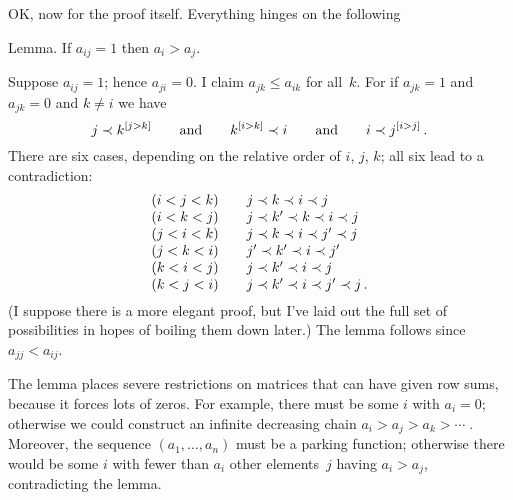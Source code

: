 OK, now for the proof itself. Everything hinges on the following

\proclaim Lemma. If $a_{ij}=1$ then $a_i>a_j$.\

\proof
Suppose $a_{ij}=1$; hence $a_{ji}=0$. I claim $a_{jk}\leq a_{ik}$
for all~$k$. For if $a_{jk}=1$ and $a_{jk}=0$ and $k\neq i$ we have
$$j\prec k^{[j>k]}\qquad{\rm and}\qquad k^{[i>k]}\prec i\qquad{\rm and}
\qquad i\prec j^{[i>j]}\,.$$
There are six cases, depending on the relative order of $i$, $j$, $k$; all
six lead to a contradiction:
$$\vcenter{\halign{$#$\hfil\qquad&$#$\hfil\cr
(i<j<k)&j\prec k\prec i\prec j\cr
(i<k<j)&j\prec k'\prec k\prec i\prec j\cr
(j<i<k)&j\prec k\prec i\prec j'\prec j\cr
(j<k<i)&j'\prec k'\prec i\prec j'\cr
(k<i<j)&j\prec k'\prec i\prec j\cr
(k<j<i)&j\prec k'\prec i\prec j'\prec j\,.\cr}}$$
(I suppose there is a more elegant proof, but I've laid out the full set of
possibilities in hopes of boiling them down later.) The lemma follows since
$a_{jj}<a_{ij}$.

The lemma places severe restrictions on matrices that can have given row
sums, because it forces lots of zeros. For example, there must be some $i$
with $a_i=0$; otherwise we could construct an infinite decreasing chain
$a_i>a_j>a_k>\cdots\;$. Moreover, the sequence $(a_1,\ldots,a_n)$ must be a
parking function; otherwise there would be some $i$ with fewer than $a_i$
other elements~$j$ having $a_i>a_j$, contradicting the lemma.

